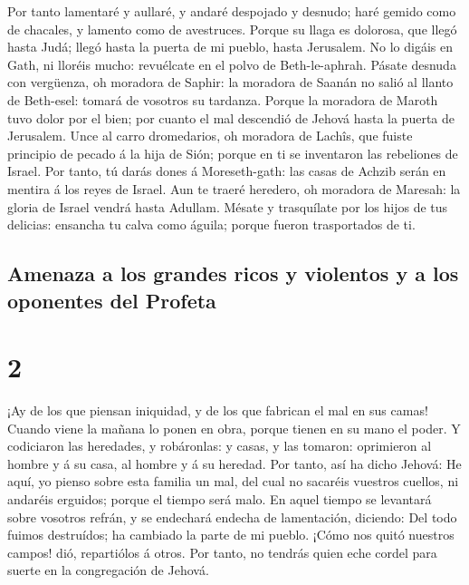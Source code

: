  Por tanto lamentaré y aullaré, y andaré despojado y
desnudo; haré gemido como de chacales, y lamento como de avestruces.
 Porque su llaga es dolorosa, que llegó hasta Judá; llegó
hasta la puerta de mi pueblo, hasta Jerusalem.  No lo
digáis en Gath, ni lloréis mucho: revuélcate en el polvo de
Beth-le-aphrah.  Pásate desnuda con vergüenza, oh
moradora de Saphir: la moradora de Saanán no salió al llanto de
Beth-esel: tomará de vosotros su tardanza.  Porque la
moradora de Maroth tuvo dolor por el bien; por cuanto el mal descendió
de Jehová hasta la puerta de Jerusalem.  Unce al carro
dromedarios, oh moradora de Lachîs, que fuiste principio de pecado á la
hija de Sión; porque en ti se inventaron las rebeliones de Israel.
 Por tanto, tú darás dones á Moreseth-gath: las casas de
Achzib serán en mentira á los reyes de Israel.  Aun te
traeré heredero, oh moradora de Maresah: la gloria de Israel vendrá
hasta Adullam.  Mésate y trasquílate por los hijos de tus
delicias: ensancha tu calva como águila; porque fueron trasportados de
ti.

\hypertarget{amenaza-a-los-grandes-ricos-y-violentos-y-a-los-oponentes-del-profeta}{%
\subsection{Amenaza a los grandes ricos y violentos y a los oponentes
del
Profeta}\label{amenaza-a-los-grandes-ricos-y-violentos-y-a-los-oponentes-del-profeta}}

\hypertarget{section-33-2}{%
\section{2}\label{section-33-2}}

 ¡Ay de los que piensan iniquidad, y de los que fabrican
el mal en sus camas! Cuando viene la mañana lo ponen en obra, porque
tienen en su mano el poder.  Y codiciaron las heredades, y
robáronlas: y casas, y las tomaron: oprimieron al hombre y á su casa, al
hombre y á su heredad.  Por tanto, así ha dicho Jehová: He
aquí, yo pienso sobre esta familia un mal, del cual no sacaréis vuestros
cuellos, ni andaréis erguidos; porque el tiempo será malo.
 En aquel tiempo se levantará sobre vosotros refrán, y se
endechará endecha de lamentación, diciendo: Del todo fuimos destruídos;
ha cambiado la parte de mi pueblo. ¡Cómo nos quitó nuestros campos! dió,
repartiólos á otros.  Por tanto, no tendrás quien eche
cordel para suerte en la congregación de Jehová.

